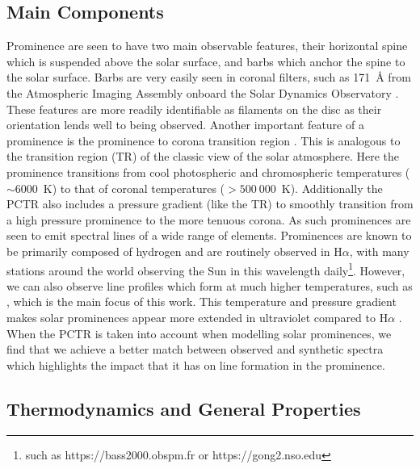 \subsection{Main Components}
Prominence are seen to have two main observable features, their horizontal spine which is suspended above the solar surface, and barbs which anchor the spine to the solar surface. Barbs are very easily seen in coronal filters, such as 171~\AA{} from the Atmospheric Imaging Assembly \citep[AIA; ][]{lemen_atmospheric_2012} onboard the Solar Dynamics Observatory \citep[SDO;][see ]{pesnell_solar_2012}. These features are more readily identifiable as filaments on the disc as their orientation lends well to being observed.
Another important feature of a prominence is the prominence to corona transition region \citep[PCTR; ][]{vial_solar_2015}. This is analogous to the transition region (TR) of the classic view of the solar atmosphere. Here the prominence transitions from cool photospheric and chromospheric temperatures ($\sim6000$~K) to that of coronal temperatures ($>500~000$~K). Additionally the PCTR also includes a pressure gradient (like the TR) to smoothly transition from a high pressure prominence to the more tenuous corona. As such prominences are seen to emit spectral lines of a wide range of elements. Prominences are known to be primarily composed of hydrogen and are routinely observed in H$\alpha$, with many stations around the world observing the Sun in this wavelength daily\footnote{such as https://bass2000.obspm.fr or https://gong2.nso.edu}. However, we can also observe line profiles which form at much higher temperatures, such as \mgiihk, which is the main focus of this work. This temperature and pressure gradient makes solar prominences appear more extended in ultraviolet compared to H$\alpha$ \citep{heinzel_why_2001}. When the PCTR is taken into account when modelling solar prominences, we find that we achieve a better match between observed and synthetic spectra  which highlights the impact that it has on line formation in the prominence.

\subsection{Thermodynamics and General Properties}


